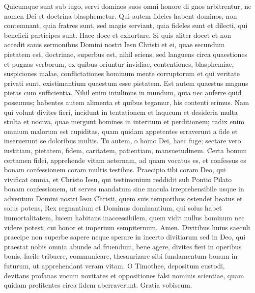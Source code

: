 \begin{biblechapter} 
\verse Quicumque sunt sub iugo, servi dominos suos omni honore di gnos arbitrentur, ne nomen Dei et doctrina blasphemetur. 
\verse Qui autem fideles habent dominos, non contemnant, quia fratres sunt, sed magis serviant, quia fideles sunt et dilecti, qui beneficii participes sunt. Haec doce et exhortare. 
\verse Si quis aliter docet et non accedit sanis sermonibus Domini nostri Iesu Christi et ei, quae secundum pietatem est, doctrinae, 
\verse superbus est, nihil sciens, sed languens circa quaestiones et pugnas verborum, ex quibus oriuntur invidiae, contentiones, blasphemiae, suspiciones malae, 
\verse conflictationes hominum mente corruptorum et qui veritate privati sunt, existimantium quaestum esse pietatem. 
\verse Est autem quaestus magnus pietas cum sufficientia. 
\verse Nihil enim intulimus in mundum, quia nec auferre quid possumus; 
\verse habentes autem alimenta et quibus tegamur, his contenti erimus. 
\verse Nam qui volunt divites fieri, incidunt in tentationem et laqueum et desideria multa stulta et nociva, quae mergunt homines in interitum et perditionem; 
\verse radix enim omnium malorum est cupiditas, quam quidam appetentes erraverunt a fide et inseruerunt se doloribus multis. 
\verse Tu autem, o homo Dei, haec fuge; sectare vero iustitiam, pietatem, fidem, caritatem, patientiam, mansuetudinem. 
\verse Certa bonum certamen fidei, apprehende vitam aeternam, ad quam vocatus es, et confessus es bonam confessionem coram multis testibus. 
\verse Praecipio tibi coram Deo, qui vivificat omnia, et Christo Iesu, qui testimonium reddidit sub Pontio Pilato bonam confessionem, 
\verse ut serves mandatum sine macula irreprehensibile usque in adventum Domini nostri Iesu Christi, 
\verse quem suis temporibus ostendet beatus et solus potens, Rex regnantium et Dominus dominantium, 
\verse qui solus habet immortalitatem, lucem habitans inaccessibilem, quem vidit nullus hominum nec videre potest; cui honor et imperium sempiternum. Amen. 
\verse Divitibus huius saeculi praecipe non superbe sapere neque sperare in incerto divitiarum sed in Deo, qui praestat nobis omnia abunde ad fruendum,  
\verse bene agere, divites fieri in operibus bonis, facile tribuere, communicare, 
\verse thesaurizare sibi fundamentum bonum in futurum, ut apprehendant veram vitam. 
\verse O Timothee, depositum custodi, devitans profanas vocum novitates et oppositiones falsi nominis scientiae, 
\verse quam quidam profitentes circa fidem aberraverunt. Gratia vobiscum.
\end{biblechapter}
